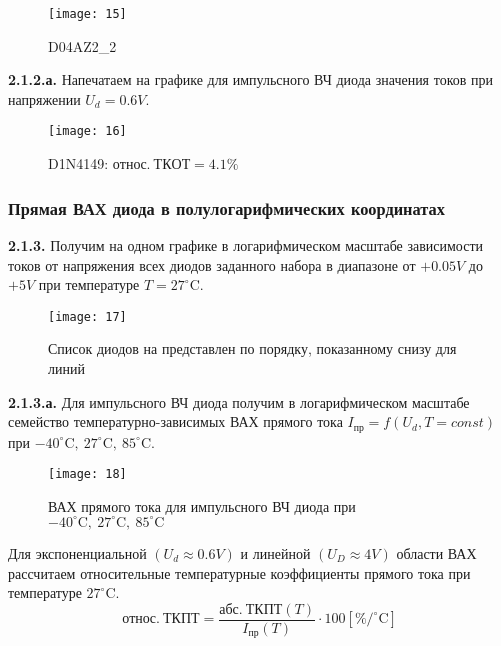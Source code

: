 \documentclass{semi}
\newcommand{\Cd}{^{\circ}\mathrm{C}}
\begin{document}
\begin{figure}[H]
	\centering
	\texttt{[image: 15]}
	\caption{D04AZ2\_2}
	\label{2.1.2_5}
\end{figure}

\newpage

\textbf{{\normalsize 2.1.2.а.}}
Напечатаем на графике для импульсного ВЧ диода значения токов при напряжении $ U_d = 0.6V $.

\begin{figure}[H]
	\centering
	\texttt{[image: 16]}
	\caption{D1N4149: $ относ.~ТКОТ = 4.1\% $}
	\label{2.1.2.2}
\end{figure}

\newpage

\subsubsection*{Прямая ВАХ диода в полулогарифмических координатах}

\textbf{{\normalsize 2.1.3.}}
Получим на одном графике в логарифмическом масштабе зависимости токов от напряжения всех диодов заданного набора в диапазоне от $ +0.05V $ до $ +5V $ при температуре $ T = 27 \Cd $.

\begin{figure}[H]
	\centering
	\texttt{[image: 17]}
	\caption{Список диодов на представлен по порядку, показанному снизу для линий}
	\label{2.1.3}
\end{figure}

\textbf{{\normalsize 2.1.3.а.}}
Для импульсного ВЧ диода получим в логарифмическом масштабе семейство температурно-зависимых ВАХ прямого тока $ I_{пр} = f(U_d, T = const) $\\
при $ -40\Cd,~27\Cd,~85\Cd $.

\begin{figure}[H]
	\centering
	\texttt{[image: 18]}
	\caption{ВАХ прямого тока для импульсного ВЧ диода при $ -40\Cd,~27\Cd,~85\Cd $}
	\label{2.1.3.1}
\end{figure}

Для экспоненциальной $ (U_d \approx 0.6V) $ и линейной $ (U_D \approx 4V) $ области ВАХ рассчитаем относительные температурные коэффициенты прямого тока при температуре $ 27 \Cd $.
\begin{equation}\label{eq:Tcoef}
относ.~ТКПТ = \dfrac{абс.~ТКПТ (T)}{I_{пр}(T)} \cdot 100 \left[ \%/\Cd \right]
\end{equation}
\end{document}
